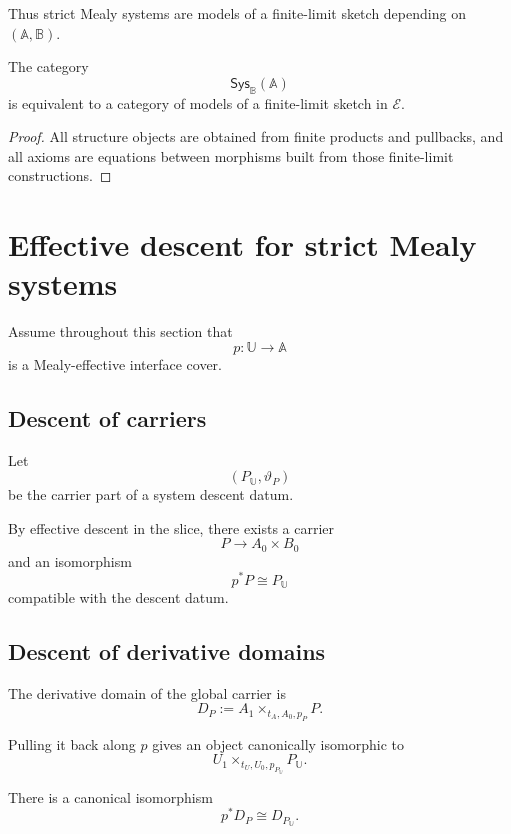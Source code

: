 Thus strict Mealy systems are models of a finite-limit sketch depending on
\((\mathbb A,\mathbb B)\).

\begin{proposition}
\label{prop:finite-limit-definability-mealy}
The category
\[
    \mathsf{Sys}_{\mathbb B}(\mathbb A)
\]
is equivalent to a category of models of a finite-limit sketch in
\(\mathcal E\).
\end{proposition}

\begin{proof}
All structure objects are obtained from finite products and pullbacks, and all
axioms are equations between morphisms built from those finite-limit
constructions.
\end{proof}

\section{Effective descent for strict Mealy systems}
\label{sec:effective-descent-strict-mealy}

Assume throughout this section that
\[
    p:\mathbb U\to\mathbb A
\]
is a Mealy-effective interface cover.

\subsection{Descent of carriers}
\label{subsec:descent-carriers}

Let
\[
    (P_{\mathbb U},\vartheta_P)
\]
be the carrier part of a system descent datum.

By effective descent in the slice, there exists a carrier
\[
    P\to A_0\times B_0
\]
and an isomorphism
\[
    p^\ast P\cong P_{\mathbb U}
\]
compatible with the descent datum.

\subsection{Descent of derivative domains}
\label{subsec:descent-derivative-domains}

The derivative domain of the global carrier is
\[
    D_P
    :=
    A_1\times_{t_A,A_0,p_P}P.
\]

Pulling it back along \(p\) gives an object canonically isomorphic to
\[
    U_1\times_{t_U,U_0,p_{P_{\mathbb U}}}P_{\mathbb U}.
\]

\begin{lemma}
\label{lem:derivative-domains-descent}
There is a canonical isomorphism
\[
    p^\ast D_P
    \cong
    D_{P_{\mathbb U}}.
\]
\end{lemma}

